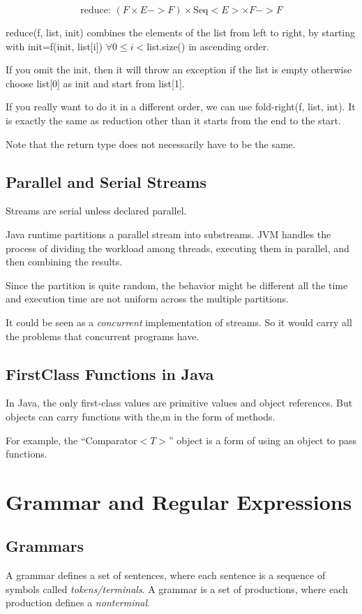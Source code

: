 \documentclass[letterpaper,12pt]{article}
\begin{document}
\begin{itemize}
            \[\text{reduce: }(F\times E -> F)\times \text{Seq}<E> \times F -> F\]

            reduce(f, list, init) combines the elements of the list from left to right, by starting with init=f(init, list[i]) $\forall 0\le i <$list.size() in ascending order.

            If you omit the init, then it will throw an exception if the list is empty otherwise choose list[0] as init and start from list[1].

            If you really want to do it in a different order, we can use fold-right(f, list, int). It is exactly the same as reduction other than it starts from the end to the start.

            Note that the return type does not necessarily have to be the same.
\end{itemize}


\subsection{Parallel and Serial Streams}

Streams are serial unless declared parallel.

Java runtime partitions a parallel stream into substreams. JVM handles the
process of dividing the workload among threads, executing them in parallel, and
then combining the results.

Since the partition is quite random, the behavior might be different all the
time and execution time are not uniform across the multiple partitions.

It could be seen as a \textit{concurrent} implementation of streams. So it would carry all the problems that concurrent programs have.
\subsection{First\-Class Functions in Java}

In Java, the only first-class values are primitive values and object references. But objects can carry functions with the,m in the form of methods.

For example, the ``Comparator$<T>$'' object is a form of using an object to pass functions.


\section{Grammar and Regular Expressions}
\subsection{Grammars}
A grammar defines a set of sentences, where each sentence is a sequence of symbols called \textit{tokens/terminals}. A grammar is a set of productions, where each production defines a \textit{nonterminal}.
\end{document}
